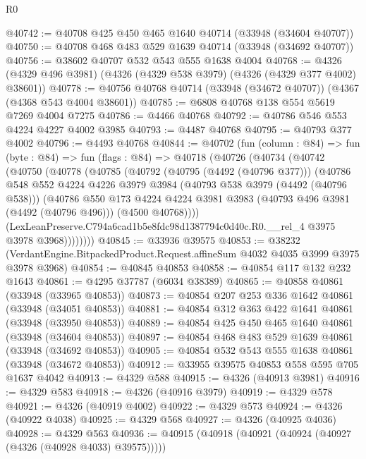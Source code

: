 \begin{lexlean}{R0}
\begin{coremodule}
@40742 := @40708 @425 @450 @465 @1640 @40714 (@33948 (@34604 @40707))
@40750 := @40708 @468 @483 @529 @1639 @40714 (@33948 (@34692 @40707))
@40756 := @38602 @40707 @532 @543 @555 @1638 @4004
@40768 := @4326 (@4329 @496 @3981) (@4326 (@4329 @538 @3979) (@4326 (@4329 @377 @4002) @38601))
@40778 := @40756 @40768 @40714 (@33948 (@34672 @40707)) (@4367 (@4368 @543 @4004 @38601))
@40785 := @6808 @40768 @138 @554 @5619 @7269 @4004 @7275
@40786 := @4466 @40768
@40792 := @40786 @546 @553 @4224 @4227 @4002 @3985
@40793 := @4487 @40768
@40795 := @40793 @377 @4002
@40796 := @4493 @40768
@40844 := @40702
    (fun (column : @84) =>
    fun (byte : @84) =>
    fun (flags : @84) =>
    @40718
      (@40726
        (@40734
          (@40742
            (@40750
              (@40778
                (@40785
                  (@40792
                    (@40795 (@4492 (@40796 @377)))
                    (@40786
                      @548
                      @552
                      @4224
                      @4226
                      @3979
                      @3984
                      (@40793 @538 @3979 (@4492 (@40796 @538)))
                      (@40786
                        @550
                        @173
                        @4224
                        @4224
                        @3981
                        @3983
                        (@40793 @496 @3981 (@4492 (@40796 @496)))
                        (@4500 @40768))))
                  (LexLeanPreserve.C794a6cad1b5e8fdc98d1387794c0d40c.R0.__rel_4
                    @3975
                    @3978
                    @3968))))))))
@40845 := @33936 @39575
@40853 := @38232
    (VerdantEngine.BitpackedProduct.Request.affineSum @4032 @4035 @3999 @3975 @3978 @3968)
@40854 := @40845 @40853
@40858 := @40854 @117 @132 @232 @1643
@40861 := @4295 @37787 (@6034 @38389)
@40865 := @40858 @40861 (@33948 (@33965 @40853))
@40873 := @40854 @207 @253 @336 @1642 @40861 (@33948 (@34051 @40853))
@40881 := @40854 @312 @363 @422 @1641 @40861 (@33948 (@33950 @40853))
@40889 := @40854 @425 @450 @465 @1640 @40861 (@33948 (@34604 @40853))
@40897 := @40854 @468 @483 @529 @1639 @40861 (@33948 (@34692 @40853))
@40905 := @40854 @532 @543 @555 @1638 @40861 (@33948 (@34672 @40853))
@40912 := @33955 @39575 @40853 @558 @595 @705 @1637 @4042
@40913 := @4329 @588
@40915 := @4326 (@40913 @3981)
@40916 := @4329 @583
@40918 := @4326 (@40916 @3979)
@40919 := @4329 @578
@40921 := @4326 (@40919 @4002)
@40922 := @4329 @573
@40924 := @4326 (@40922 @4038)
@40925 := @4329 @568
@40927 := @4326 (@40925 @4036)
@40928 := @4329 @563
@40936 := @40915 (@40918 (@40921 (@40924 (@40927 (@4326 (@40928 @4033) @39575)))))

\end{coremodule}
\end{lexlean}
